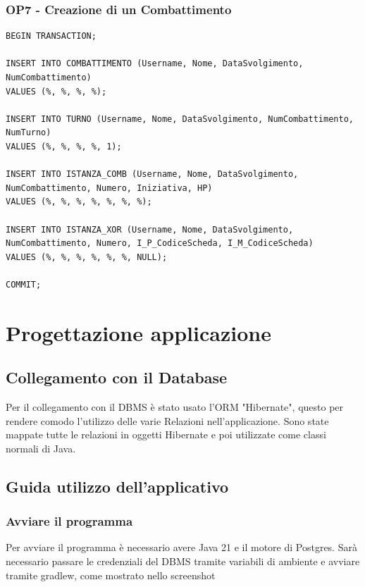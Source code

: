 \documentclass[a4paper,12pt]{report}
\begin{document}
\subsection{OP7 - Creazione di un Combattimento}

\begin{lstlisting}
BEGIN TRANSACTION;

INSERT INTO COMBATTIMENTO (Username, Nome, DataSvolgimento, NumCombattimento)
VALUES (%, %, %, %);

INSERT INTO TURNO (Username, Nome, DataSvolgimento, NumCombattimento, NumTurno)
VALUES (%, %, %, %, 1);

INSERT INTO ISTANZA_COMB (Username, Nome, DataSvolgimento, NumCombattimento, Numero, Iniziativa, HP)
VALUES (%, %, %, %, %, %, %);

INSERT INTO ISTANZA_XOR (Username, Nome, DataSvolgimento, NumCombattimento, Numero, I_P_CodiceScheda, I_M_CodiceScheda)
VALUES (%, %, %, %, %, %, NULL);

COMMIT;
\end{lstlisting}

\chapter{Progettazione applicazione}

\section{Collegamento con il Database}

Per il collegamento con il DBMS è stato usato l'ORM "Hibernate", questo per rendere comodo l'utilizzo delle varie Relazioni nell'applicazione.
Sono state mappate tutte le relazioni in oggetti Hibernate e poi utilizzate come classi normali di Java.

\section{Guida utilizzo dell'applicativo}

\subsection{Avviare il programma}

Per avviare il programma è necessario avere Java 21 e il motore di Postgres.
Sarà necessario passare le credenziali del DBMS tramite variabili di ambiente e avviare tramite gradlew, come mostrato nello screenshot
\end{document}
